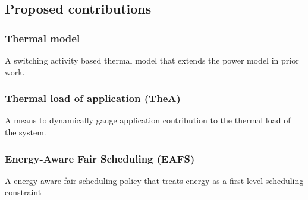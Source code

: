 \documentclass[11pt]{article}
\begin{document}
\subsection{Proposed contributions}
\label{sec-1_5}
\subsubsection{Thermal model}
\label{sec-1_5_1}

A switching activity based thermal model that extends the power model in prior work.
\subsubsection{Thermal load of application (TheA)}
\label{sec-1_5_2}

A means to dynamically gauge application contribution to the thermal load of the system.
\subsubsection{Energy-Aware Fair Scheduling (EAFS)}
\label{sec-1_5_3}
A energy-aware fair scheduling policy that treats energy as a first
level scheduling constraint 

\label{sec:references}


\end{document}
